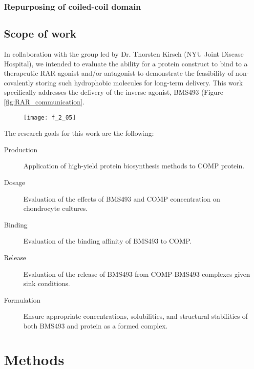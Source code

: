 \begin{refsection}
\subsubsection{Repurposing of coiled-coil domain}

\subsection{Scope of work}


In collaboration with the group led by Dr. Thorsten Kirsch (NYU Joint Disease
Hospital), we intended to evaluate the ability for a protein construct to bind
to a therapeutic RAR agonist and/or antagonist to demonstrate the feasibility of
non-covalently storing such hydrophobic molecules for long-term delivery. This
work specifically addresses the delivery of the inverse agonist, BMS493 (Figure
\ref{fig:RAR_communication}.
\begin{figure}[h!] \centering \texttt{[image: f\_2\_05]}
    \caption[]{\cite{}}\label{fig:research_intention} \end{figure}
The research goals for this work are the following:
\begin{description}
    \item[Production] Application of high-yield protein biosynthesis methods to
        COMP protein.
    \item[Dosage] Evaluation of the effects of BMS493 and COMP concentration on
         chondrocyte cultures.
    \item[Binding] Evaluation of the binding affinity of BMS493 to COMP.
    \item[Release] Evaluation of the release of BMS493 from COMP-BMS493
        complexes given sink conditions.
    \item[Formulation] Ensure appropriate concentrations, solubilities, and
        structural stabilities of both BMS493 and protein as a formed complex.
\end{description}

\section{Methods}


\end{refsection}
